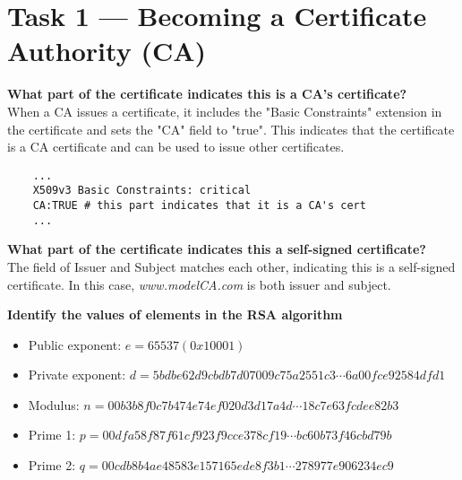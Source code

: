\section{Task 1 --- Becoming a Certificate Authority (CA)}
%

\textbf{What part of the certificate indicates this is a CA's certificate?}\\
%
When a CA issues a certificate, it includes the "Basic Constraints"
extension in the certificate and sets the "CA" field to "true". This
indicates that the certificate is a CA certificate and can be used to
issue other certificates.

\begin{verbatim}
    ...
    X509v3 Basic Constraints: critical
    CA:TRUE # this part indicates that it is a CA's cert
    ...
\end{verbatim}

\textbf{What part of the certificate indicates this a self-signed
certificate?}\\
%
The field of {\selectfont Issuer} and {\selectfont
Subject} matches each other, indicating this is a self-signed certificate.
In this case, \emph{www.modelCA.com} is both issuer and subject.

\textbf{Identify the values of elements in the RSA algorithm}\\
%
\begin{itemize}
    \item Public exponent: \(e = 65537 (0x10001)\)
    \item Private exponent: \(d = 5bdbe62d9cbdb7d07009c75a2551c3 \cdots
    6a00fce92584dfd1\)
    \item Modulus: \(n = 00b3b8f0c7b474e74ef020d3d17a4d \cdots
    18c7e63fcdee82b3\)
    \item Prime 1: \(p = 00dfa58f87f61cf923f9cce378cf19 \cdots
    bc60b73f46cbd79b\)
    \item Prime 2: \(q = 00cdb8b4ae48583e157165ede8f3b1 \cdots
    278977e906234ec9\)
\end{itemize}